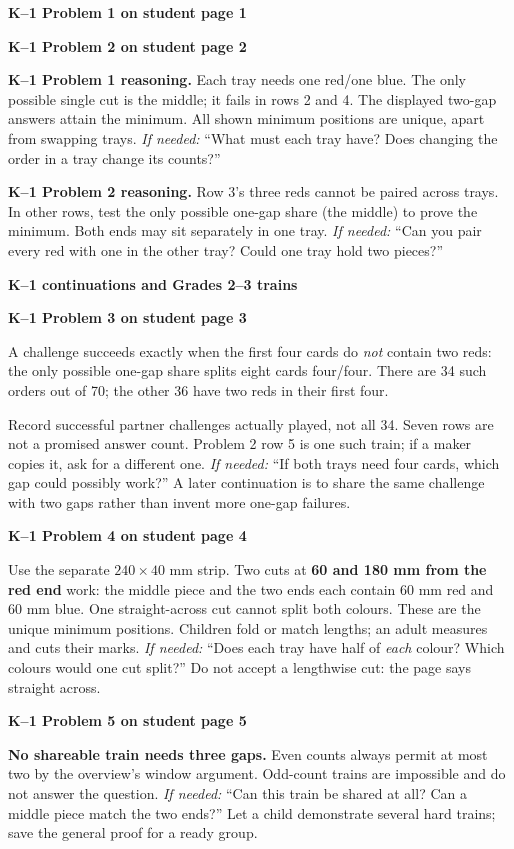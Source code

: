 \documentclass[11pt]{article}
\newcommand{\head}[1]{\par\textbf{\large #1}\par}
\newcommand{\sub}[1]{\par\textbf{#1}\par}
\newcommand{\hint}[1]{\textit{If needed:} #1}
\begin{document}
\begin{minipage}[t]{.46\linewidth}
\sub{K--1 Problem 1 on student page 1}
\small\ktable
\end{minipage}\hfill
\begin{minipage}[t]{.50\linewidth}
\sub{K--1 Problem 2 on student page 2}
\small\ksecond
\end{minipage}

\textbf{K--1 Problem 1 reasoning.} Each tray needs one red/one blue. The only possible single cut is the middle; it fails in rows 2 and 4. The displayed two-gap answers attain the minimum. All shown minimum positions are unique, apart from swapping trays. \hint{``What must each tray have? Does changing the order in a tray change its counts?''}

\textbf{K--1 Problem 2 reasoning.} Row 3's three reds cannot be paired across trays. In other rows, test the only possible one-gap share (the middle) to prove the minimum. Both ends may sit separately in one tray. \hint{``Can you pair every red with one in the other tray? Could one tray hold two pieces?''}
\newpage
\head{K--1 continuations and Grades 2--3 trains}
\sub{K--1 Problem 3 on student page 3}
A challenge succeeds exactly when the first four cards do \emph{not} contain two reds: the only possible one-gap share splits eight cards four/four. There are 34 such orders out of 70; the other 36 have two reds in their first four.

Record successful partner challenges actually played, not all 34. Seven rows are not a promised answer count. Problem 2 row 5 is one such train; if a maker copies it, ask for a different one. \hint{``If both trays need four cards, which gap could possibly work?''} A later continuation is to share the same challenge with two gaps rather than invent more one-gap failures.

\sub{K--1 Problem 4 on student page 4}
Use the separate $240\times40$ mm strip. Two cuts at \textbf{60 and 180 mm from the red end} work: the middle piece and the two ends each contain 60 mm red and 60 mm blue. One straight-across cut cannot split both colours. These are the unique minimum positions. Children fold or match lengths; an adult measures and cuts their marks. \hint{``Does each tray have half of \emph{each} colour? Which colours would one cut split?''} Do not accept a lengthwise cut: the page says straight across.

\sub{K--1 Problem 5 on student page 5}
\textbf{No shareable train needs three gaps.} Even counts always permit at most two by the overview's window argument. Odd-count trains are impossible and do not answer the question. \hint{``Can this train be shared at all? Can a middle piece match the two ends?''} Let a child demonstrate several hard trains; save the general proof for a ready group.
\end{document}
